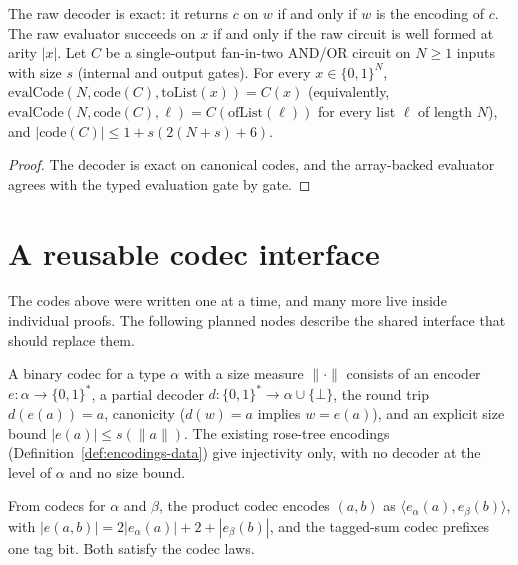\begin{theorem}
  \label{thm:encodings-circuit-code}
  \leanok
  The raw decoder is exact: it returns $c$ on $w$ if and only if $w$ is the
  encoding of $c$. The raw evaluator succeeds on $x$ if and only if the raw
  circuit is well formed at arity $|x|$. Let $C$ be a single-output fan-in-two
  AND/OR circuit on $N \ge 1$ inputs with size $s$ (internal and output
  gates). For every $x \in \{0,1\}^N$,
  $\mathrm{evalCode}(N, \mathrm{code}(C), \mathrm{toList}(x)) = C(x)$
  (equivalently, $\mathrm{evalCode}(N, \mathrm{code}(C), \ell) =
  C(\mathrm{ofList}(\ell))$ for every list $\ell$ of length $N$), and
  $|\mathrm{code}(C)| \le 1 + s(2(N + s) + 6)$.
\end{theorem}
\begin{proof}
  \leanok
  The decoder is exact on canonical codes, and the array-backed evaluator
  agrees with the typed evaluation gate by gate.
\end{proof}

\section{A reusable codec interface}

The codes above were written one at a time, and many more live inside
individual proofs. The following planned nodes describe the shared interface
that should replace them.

\begin{definition}
  \label{def:encodings-codec}
  A binary codec for a type $\alpha$ with a size measure $\|\cdot\|$ consists of
  an encoder $e : \alpha \to \{0,1\}^*$, a partial decoder
  $d : \{0,1\}^* \to \alpha \cup \{\bot\}$, the round trip $d(e(a)) = a$,
  canonicity ($d(w) = a$ implies $w = e(a)$), and an explicit size bound
  $|e(a)| \le s(\|a\|)$. The existing rose-tree encodings
  (Definition~\ref{def:encodings-data}) give injectivity only, with no decoder
  at the level of $\alpha$ and no size bound.
\end{definition}

\begin{definition}
  \label{def:encodings-codec-combinators}
  \notready
  From codecs for $\alpha$ and $\beta$, the product codec encodes $(a, b)$ as
  $\langle e_\alpha(a), e_\beta(b) \rangle$, with
  $|e(a, b)| = 2|e_\alpha(a)| + 2 + |e_\beta(b)|$, and the tagged-sum codec
  prefixes one tag bit. Both satisfy the codec laws.
\end{definition}


